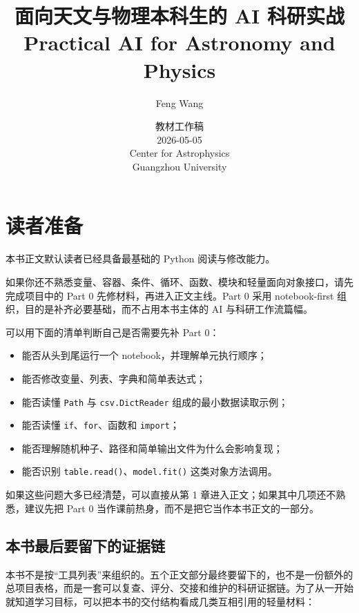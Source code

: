\documentclass[11pt,a4paper,openany,fontset=fandol]{ctexbook}
\begin{document}
\title{面向天文与物理本科生的 AI 科研实战\\\large Practical AI for Astronomy and Physics}
\author{Feng Wang}
\date{教材工作稿 \\ 2026-05-05 \\ \vspace{0.6cm} Center for Astrophysics \\ Guangzhou University}

\maketitle

\tableofcontents
\chapter*{读者准备}

本书正文默认读者已经具备最基础的 Python 阅读与修改能力。

如果你还不熟悉变量、容器、条件、循环、函数、模块和轻量面向对象接口，请先完成项目中的 Part 0 先修材料，再进入正文主线。Part 0 采用 notebook-first 组织，目的是补齐必要基础，而不占用本书主体的 AI 与科研工作流篇幅。

可以用下面的清单判断自己是否需要先补 Part 0：

\begin{itemize}
    \item 能否从头到尾运行一个 notebook，并理解单元执行顺序；
    \item 能否修改变量、列表、字典和简单表达式；
    \item 能否读懂 \texttt{Path} 与 \texttt{csv.DictReader} 组成的最小数据读取示例；
    \item 能否读懂 \texttt{if}、\texttt{for}、函数和 \texttt{import}；
    \item 能否理解随机种子、路径和简单输出文件为什么会影响复现；
    \item 能否识别 \texttt{table.read()}、\texttt{model.fit()} 这类对象方法调用。
\end{itemize}

如果这些问题大多已经清楚，可以直接从第 1 章进入正文；如果其中几项还不熟悉，建议先把 Part 0 当作课前热身，而不是把它当作本书正文的一部分。

\section*{本书最后要留下的证据链}

本书不是按“工具列表”来组织的。五个正文部分最终要留下的，也不是一份额外的总项目表格，而是一套可以复查、评分、交接和维护的科研证据链。为了从一开始就知道学习目标，可以把本书的交付结构看成几类互相引用的轻量材料：
\end{document}
